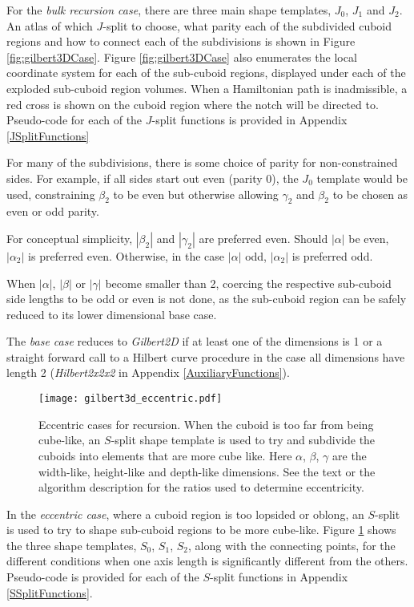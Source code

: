 For the \textit{bulk recursion case}, there are three main shape templates, $J_0$, $J_1$ and $J_2$.
An atlas of which $J$-split to choose, what parity each of the subdivided cuboid regions and how
to connect each of the subdivisions is shown in Figure \ref{fig:gilbert3DCase}.
Figure \ref{fig:gilbert3DCase} also enumerates the local coordinate system for each of the sub-cuboid
regions, displayed under each of the exploded sub-cuboid region volumes.
When a Hamiltonian path is inadmissible,
a red cross is shown on the cuboid region where the notch will be directed to.
Pseudo-code for each of the $J$-split functions is provided in Appendix \ref{JSplitFunctions}

For many of the subdivisions, there is some choice of parity for non-constrained sides.
For example, if all sides start out even (parity $0$), the $J_0$ template would be used, constraining
$\beta_2$ to be even but otherwise allowing $\gamma_2$ and $\beta_2$ to be chosen as even or odd parity.

For conceptual simplicity, $|\beta_2|$ and $|\gamma_2|$ are preferred even.
Should $|\alpha|$ be even, $|\alpha_2|$ is preferred even.
Otherwise, in the case $|\alpha|$ odd, $|\alpha_2|$ is preferred odd.

When $|\alpha|$, $|\beta|$ or $|\gamma|$ become smaller than 2, coercing the respective sub-cuboid
side lengths to be odd or even is not done, as the sub-cuboid region can be safely reduced to its
lower dimensional base case.

The \textit{base case} reduces to \textit{Gilbert2D} if at least one of the dimensions is 1 or a straight forward call to a Hilbert curve
procedure in the case all dimensions have length 2 (\textit{Hilbert2x2x2} in Appendix \ref{AuxiliaryFunctions}).

\begin{figure}[h]
  \centering
  \texttt{[image: gilbert3d\_eccentric.pdf]}
  \caption{ Eccentric cases for recursion. When the cuboid is too far from being cube-like, an $S$-split shape template is used to try and subdivide the cuboids into elements that are more cube like. Here $\alpha$, $\beta$, $\gamma$ are the width-like, height-like and depth-like dimensions. See the text or the algorithm description for the ratios used to determine eccentricity. }
  \label{fig:gilbert3DEccentricCase}
\end{figure}

In the \textit{eccentric case}, where a cuboid region is too lopsided or oblong, an $S$-split is used to try to shape
sub-cuboid regions to be more cube-like.
Figure \ref{fig:gilbert3DEccentricCase} shows the three shape templates, $S_0$, $S_1$, $S_2$, along with the connecting
points, for the different conditions when one axis length is significantly different from the others.
Pseudo-code is provided for each of the $S$-split functions in Appendix \ref{SSplitFunctions}.

